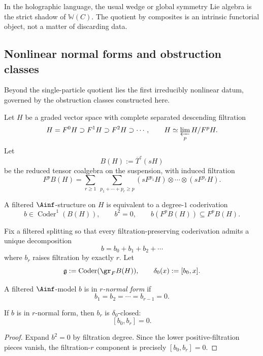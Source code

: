 \begin{remark}
\label{rem:cbt-wedge-functorial}
In the holographic language, the usual wedge or global symmetry Lie algebra is the strict shadow of $\mathbb{W}(C)$. The quotient by composites is an intrinsic functorial object, not a matter of discarding data.
\end{remark}

\subsection{Nonlinear normal forms and obstruction classes}
\label{sec:cbt-nonlinear-normal}

Beyond the single-particle quotient lies the first irreducibly nonlinear datum, governed by the obstruction classes constructed here.

Let $H$ be a graded vector space with complete separated descending filtration
\[
H=F^0H\supset F^1H\supset F^2H\supset \cdots,
\qquad
H\simeq \varprojlim_p H/F^pH.
\]
Let
\[
B(H):=\overline{T}^c(sH)
\]
be the reduced tensor coalgebra on the suspension, with induced filtration
\[
F^pB(H)=
\sum_{r\ge1}\ \sum_{p_1+\cdots+p_r\ge p}
(sF^{p_1}H)\otimes\cdots\otimes(sF^{p_r}H).
\]

A filtered $\Ainf$-structure on $H$ is equivalent to a degree-$1$ coderivation
\[
b\in \operatorname{Coder}^1(B(H)),
\qquad
b^2=0,
\qquad
b(F^pB(H))\subseteq F^pB(H).
\]

Fix a filtered splitting so that every filtration-preserving coderivation admits a unique decomposition
\[
b=b_0+b_1+b_2+\cdots
\]
where $b_r$ raises filtration by exactly $r$. Let
\[
\mathfrak g:=\operatorname{Coder}(\gr_FB(H)),
\qquad
\delta_0(x):=[b_0,x].
\]

\begin{definition}
\label{def:cbt-r-normal-form}
A filtered $\Ainf$-model $b$ is in \emph{$r$-normal form} if
\[
b_1=b_2=\cdots=b_{r-1}=0.
\]
\end{definition}

\begin{lemma}
\label{lem:cbt-br-closed}
\ClaimStatusProvedHere
If $b$ is in $r$-normal form, then $b_r$ is $\delta_0$-closed:
\[
[b_0,b_r]=0.
\]
\end{lemma}

\begin{proof}
Expand $b^2=0$ by filtration degree. Since the lower positive-filtration pieces vanish, the filtration-$r$ component is precisely $[b_0,b_r]=0$.
\end{proof}

